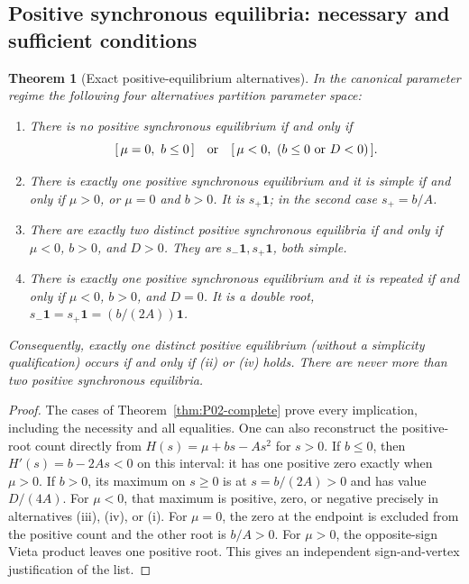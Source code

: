 \documentclass[11pt]{article}
\newcommand{\one}{\mathbf{1}}
\newtheorem{theorem}{Theorem}[section]
\theoremstyle{definition}
\theoremstyle{remark}
\begin{document}
\subsection{Positive synchronous equilibria: necessary and sufficient conditions}

\begin{theorem}[Exact positive-equilibrium alternatives]
\label{thm:P02-positive}
In the canonical parameter regime the following four alternatives
partition parameter space:
\begin{enumerate}[label=(\roman*),leftmargin=*]
\item There is no positive synchronous equilibrium if and only if
\begin{equation}
\label{eq:P02-none}
 [\,\mu=0,\ b\le0\,]
 \quad\hbox{or}\quad
 [\,\mu<0,\ (b\le0\ \hbox{or}\ D<0)\,].
\end{equation}
\item There is exactly one positive synchronous equilibrium and it is
simple if and only if $\mu>0$, or $\mu=0$ and $b>0$.
It is $s_+\one$; in the second case $s_+=b/A$.
\item There are exactly two distinct positive synchronous equilibria
if and only if $\mu<0$, $b>0$, and $D>0$. They are
$s_-\one,s_+\one$, both simple.
\item There is exactly one positive synchronous equilibrium and it
is repeated if and only if $\mu<0$, $b>0$, and $D=0$.
It is a double root, $s_-\one=s_+\one=(b/(2A))\one$.
\end{enumerate}
Consequently, exactly one distinct positive equilibrium (without a
simplicity qualification) occurs if and only if (ii) or (iv) holds.
There are never more than two positive synchronous equilibria.
\end{theorem}

\begin{proof}
The cases of Theorem~\ref{thm:P02-complete} prove every implication,
including the necessity and all equalities. One can also reconstruct
the positive-root count directly from
$H(s)=\mu+bs-As^2$ for $s>0$. If $b\le0$, then
$H'(s)=b-2As<0$ on this interval: it has one positive zero exactly
when $\mu>0$. If $b>0$, its maximum on $s\ge0$ is at
$s=b/(2A)>0$ and has value $D/(4A)$. For $\mu<0$, that maximum
is positive, zero, or negative precisely in alternatives (iii),
(iv), or (i). For $\mu=0$, the zero at the endpoint is excluded
from the positive count and the other root is $b/A>0$. For
$\mu>0$, the opposite-sign Vieta product leaves one positive root.
This gives an independent sign-and-vertex justification of the list.
\end{proof}
\end{document}
